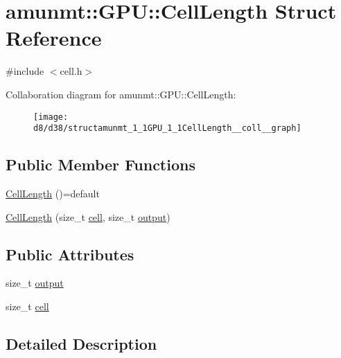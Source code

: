 \hypertarget{structamunmt_1_1GPU_1_1CellLength}{}\section{amunmt\+:\+:G\+PU\+:\+:Cell\+Length Struct Reference}
\label{structamunmt_1_1GPU_1_1CellLength}


{\ttfamily \#include $<$cell.\+h$>$}



Collaboration diagram for amunmt\+:\+:G\+PU\+:\+:Cell\+Length\+:
\nopagebreak
\begin{figure}[H]
\begin{center}
\leavevmode
\texttt{[image: d8/d38/structamunmt\_1\_1GPU\_1\_1CellLength\_\_coll\_\_graph]}
\end{center}
\end{figure}
\subsection*{Public Member Functions}
\begin{DoxyCompactItemize}
\item 
\hyperlink{structamunmt_1_1GPU_1_1CellLength_a2b6806ade4381743d2db8d040ca40345}{Cell\+Length} ()=default
\item 
\hyperlink{structamunmt_1_1GPU_1_1CellLength_a904a9e1eda40461d02f28e8692bb61f3}{Cell\+Length} (size\+\_\+t \hyperlink{structamunmt_1_1GPU_1_1CellLength_a6920571ba5a7ffb26c7e361b19ce2e7c}{cell}, size\+\_\+t \hyperlink{structamunmt_1_1GPU_1_1CellLength_af6478b361445f8c7d5b2d45ebc8fd5a6}{output})
\end{DoxyCompactItemize}
\subsection*{Public Attributes}
\begin{DoxyCompactItemize}
\item 
size\+\_\+t \hyperlink{structamunmt_1_1GPU_1_1CellLength_af6478b361445f8c7d5b2d45ebc8fd5a6}{output}
\item 
size\+\_\+t \hyperlink{structamunmt_1_1GPU_1_1CellLength_a6920571ba5a7ffb26c7e361b19ce2e7c}{cell}
\end{DoxyCompactItemize}


\subsection{Detailed Description}


